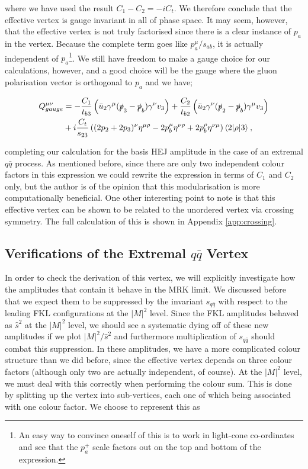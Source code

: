 where we have used the result $C_1 - C_2 = -iC_t$. We therefore conclude that the effective vertex is gauge invariant in all of phase space. It may seem, however, that the effective vertex is not truly factorised since there is a clear instance of $p_a$ in the vertex. Because the complete term goes like $p_a^\mu/s_{ab}$, it is actually independent of $p_a$\footnote{An easy way to convince oneself of this is to work in light-cone co-ordinates and see that the $p_a^+$ scale factors out on the top and bottom of the expression.}. We still have freedom to make a gauge choice for our calculations, however, and a good choice will be the gauge where the gluon polarisation vector is orthogonal to $p_a$ and we have; %

\begin{equation}
\begin{split}
Q^{\mu \nu}_{gauge} &= -\frac{C_1}{t_{b3}} \left(\bar{u}_2 \gamma^\mu (\slashed{p}_3-\slashed{p}_b)\gamma^\nu v_3 \right) + \frac{C_2}{t_{b2}} \left( \bar{u}_2 \gamma^\nu (\slashed{p}_2-\slashed{p}_b) \gamma^\mu v_3 \right)  \\
&+ i  \frac{C_t}{s_{23}} \left((2p_2+2p_3)^\nu \eta^{\mu \rho} - 2p_b^\mu \eta^{\nu \rho} + 2p_b^\rho \eta^{\nu \mu} \right) \mathinner{\langle2\vert\rho\vert3\rangle}_{},
\end{split}
\end{equation}

completing our calculation for the basis HEJ amplitude in the case of an extremal $q \bar{q}$ process. As mentioned before, since there are only two independent colour factors in this expression we could rewrite the expression in terms of $C_1$ and $C_2$ only, but the author is of the opinion that this modularisation is more computationally beneficial. One other interesting point to note is that this effective vertex can be shown to be related to the unordered vertex via crossing symmetry. The full calculation of this is shown in Appendix \ref{app:crossing}. 

\subsection{Verifications of the Extremal $q\bar{q}$ Vertex}

In order to check the derivation of this vertex, we will explicitly investigate how the amplitudes that contain it behave in the MRK limit. We discussed before that we expect them to be suppressed by the invariant $s_{q\bar{q}}$ with respect to the leading FKL configurations at the $|M|^2$ level. Since the FKL amplitudes behaved as $\hat{s}^2$ at the $|M|^2$ level, we should see a systematic dying off of these new amplitudes if we plot $|M|^2/\hat{s}^2$ and furthermore multiplication of $s_{q \bar{q}}$ should combat this suppression. In these amplitudes, we have a more complicated colour structure than we did before, since the effective vertex depends on three colour factors (although only two are actually independent, of course). At the $|M|^2$ level, we must deal with this correctly when performing the colour sum. This is done by splitting up the vertex into sub-vertices, each one of which being associated with one colour factor. We choose to represent this as

